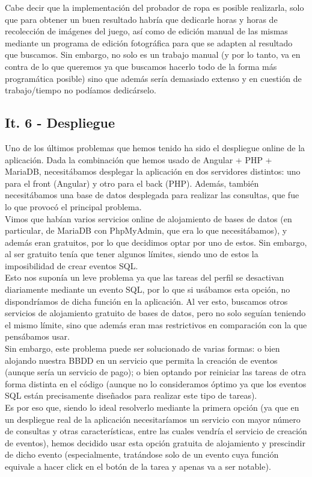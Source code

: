 Cabe decir que la implementación del probador de ropa es posible realizarla, solo que para obtener un buen resultado habría que dedicarle horas y horas de recolección de imágenes del juego, así como de edición manual de las mismas mediante un programa de edición fotográfica para que se adapten al resultado que buscamos. Sin embargo, no solo es un trabajo manual (y por lo tanto, va en contra de lo que queremos ya que buscamos hacerlo todo de la forma más programática posible) sino que además sería demasiado extenso y en cuestión de trabajo/tiempo no podíamos dedicárselo.

\subsection{It. 6 - Despliegue}

Uno de los últimos problemas que hemos tenido ha sido el despliegue online de la aplicación. Dada la combinación que hemos usado de Angular + PHP + MariaDB, necesitábamos desplegar la aplicación en dos servidores distintos: uno para el front (Angular) y otro para el back (PHP). Además, también necesitábamos una base de datos desplegada para realizar las consultas, que fue lo que provocó el principal problema.\\

Vimos que habían varios servicios online de alojamiento de bases de datos (en particular, de MariaDB con PhpMyAdmin, que era lo que necesitábamos), y además eran gratuitos, por lo que decidimos optar por uno de estos. Sin embargo, al ser gratuito tenía que tener algunos límites, siendo uno de estos la imposibilidad de crear eventos SQL.\\

Esto nos suponía un leve problema ya que las tareas del perfil se desactivan diariamente mediante un evento SQL, por lo que si usábamos esta opción, no dispondríamos de dicha función en la aplicación. Al ver esto, buscamos otros servicios de alojamiento gratuito de bases de datos, pero no solo seguían teniendo el mismo límite, sino que además eran mas restrictivos en comparación con la que pensábamos usar.\\

Sin embargo, este problema puede ser solucionado de varias formas: o bien alojando nuestra BBDD en un servicio que permita la creación de eventos (aunque sería un servicio de pago); o bien optando por reiniciar las tareas de otra forma distinta en el código (aunque no lo consideramos óptimo ya que los eventos SQL están precisamente diseñados para realizar este tipo de tareas).\\

Es por eso que, siendo lo ideal resolverlo mediante la primera opción (ya que en un despliegue real de la aplicación necesitaríamos un servicio con mayor número de consultas y otras características, entre las cuales vendría el servicio de creación de eventos), hemos decidido usar esta opción gratuita de alojamiento y prescindir de dicho evento (especialmente, tratándose solo de un evento cuya función equivale a hacer click en el botón de la tarea y apenas va a ser notable).\\





	